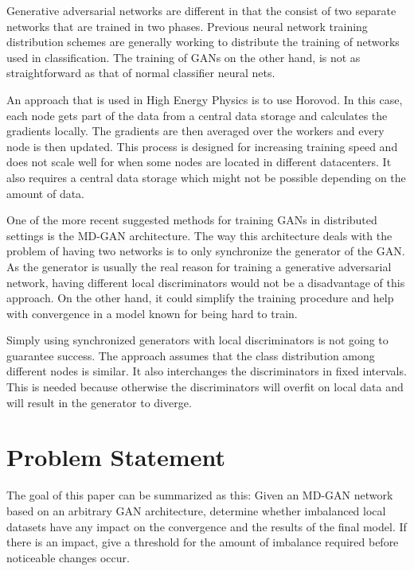 \documentclass[11pt]{article}       %
\begin{document}
Generative adversarial networks are different in that the consist of two separate networks that are trained in two phases. Previous neural network training distribution schemes are generally working to distribute the training of networks used in classification. The training of GANs on the other hand, is not as straightforward as that of normal classifier neural nets.

An approach that is used in High Energy Physics\cite{vallecorsa2018distributed} is to use Horovod\cite{horovod}. In this case, each node gets part of the data from a central data storage and calculates the gradients locally. The gradients are then averaged over the workers and every node is then updated. This process is designed for increasing training speed and does not scale well for when some nodes are located in different datacenters. It also requires a central data storage which might not be possible depending on the amount of data.

One of the more recent suggested methods for training GANs in distributed settings is the MD-GAN architecture.\cite{Hardy2019} The way this architecture deals with the problem of having two networks is to only synchronize the generator of the GAN. As the generator is usually the real reason for training a generative adversarial network, having different local discriminators would not be a disadvantage of this approach. On the other hand, it could simplify the training procedure and help with convergence in a model known for being hard to train.

Simply using synchronized generators with local discriminators is not going to guarantee success. The approach assumes that the class distribution among different nodes is similar. It also interchanges the discriminators in fixed intervals. This is needed because otherwise the discriminators will overfit on local data and will result in the generator to diverge.

\section{Problem Statement} \label{problemStatement}

The goal of this paper can be summarized as this: Given an MD-GAN network based on an arbitrary GAN architecture, determine whether imbalanced local datasets have any impact on the convergence and the results of the final model. If there is an impact, give a threshold for the amount of imbalance required before noticeable changes occur.
\end{document}
